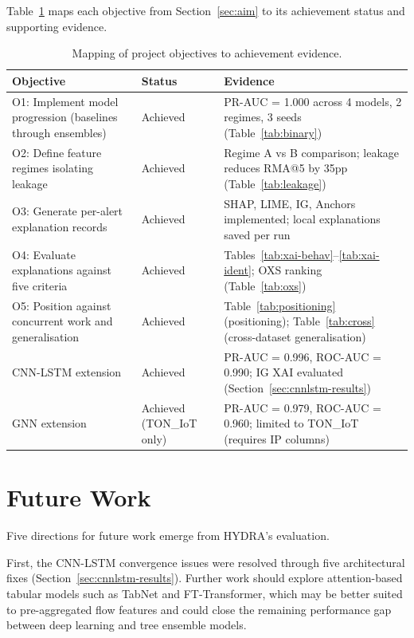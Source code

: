 \documentclass[12pt,a4paper]{report}
\begin{document}
Table~\ref{tab:obj-achievement} maps each objective from Section~\ref{sec:aim} to its achievement status and supporting evidence.

\begin{table}[H]
\centering
\caption{Mapping of project objectives to achievement evidence.}
\label{tab:obj-achievement}
\small
\begin{tabular}{p{}lp{}}
\toprule
\textbf{Objective} & \textbf{Status} & \textbf{Evidence} \\
\midrule
O1: Implement model progression (baselines through ensembles) & Achieved & PR-AUC = 1.000 across 4 models, 2 regimes, 3 seeds (Table~\ref{tab:binary}) \\
\addlinespace
O2: Define feature regimes isolating leakage & Achieved & Regime A vs B comparison; leakage reduces RMA@5 by 35pp (Table~\ref{tab:leakage}) \\
\addlinespace
O3: Generate per-alert explanation records & Achieved & SHAP, LIME, IG, Anchors implemented; local explanations saved per run \\
\addlinespace
O4: Evaluate explanations against five criteria & Achieved & Tables~\ref{tab:xai-behav}--\ref{tab:xai-ident}; OXS ranking (Table~\ref{tab:oxs}) \\
\addlinespace
O5: Position against concurrent work and generalisation & Achieved & Table~\ref{tab:positioning} (positioning); Table~\ref{tab:cross} (cross-dataset generalisation) \\
\addlinespace
CNN-LSTM extension & Achieved & PR-AUC = 0.996, ROC-AUC = 0.990; IG XAI evaluated (Section~\ref{sec:cnnlstm-results}) \\
\addlinespace
GNN extension & Achieved (TON\_IoT only) & PR-AUC = 0.979, ROC-AUC = 0.960; limited to TON\_IoT (requires IP columns) \\
\bottomrule
\end{tabular}
\end{table}

\section{Future Work}
\label{sec:future}

Five directions for future work emerge from HYDRA's evaluation.

First, the CNN-LSTM convergence issues were resolved through five architectural fixes (Section~\ref{sec:cnnlstm-results}). Further work should explore attention-based tabular models such as TabNet and FT-Transformer, which may be better suited to pre-aggregated flow features and could close the remaining performance gap between deep learning and tree ensemble models.
\end{document}
